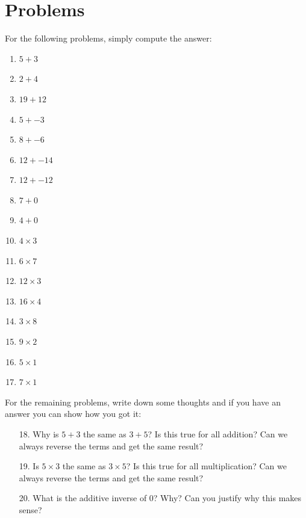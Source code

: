 \documentclass{article}
\begin{document}
\section*{Problems}
\begin{multicols*}{2}
    For the following problems, simply compute the answer:
    \begin{enumerate}
        \item $5 + 3$
        \item $2 + 4$ 
        \item $19 + 12$ 
        \item $5 + -3$
        \item $8 + -6$
        \item $12 + -14$ 
        \item $12 + -12$
        \item $7 + 0$
        \item $4 + 0$
        \item $4 \times 3$
        \item $6 \times 7$
        \item $12 \times 3$
        \item $16 \times 4$
        \item $3 \times 8$
        \item $9 \times 2$
        \item $5 \times 1$
        \item $7 \times 1$
    \end{enumerate}

    For the remaining problems, write down some thoughts and if you have an answer you can show how you got it:
    \begin{enumerate}
        \item[18. ] Why is $5 + 3$ the same as $3 + 5$? Is this true for all addition? Can we always reverse the terms and get the same result?
        \item[19. ] Is $5 \times 3$ the same as $3 \times 5$? Is this true for all multiplication? Can we always reverse the terms and get the same result?
        \item[20. ] What is the additive inverse of $0$? Why? Can you justify why this makes sense?   
    \end{enumerate}

\end{multicols*}
\end{document}
